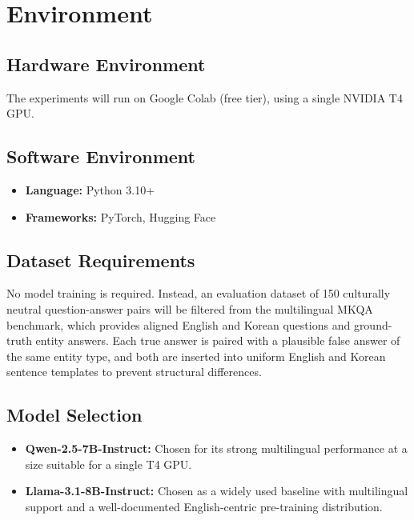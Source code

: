 \section{Environment}
\label{sec:environment}

\subsection{Hardware Environment}

The experiments will run on Google Colab (free tier), using a single NVIDIA T4 GPU.

\subsection{Software Environment}

\begin{itemize}
    \item \textbf{Language:} Python 3.10+
    \item \textbf{Frameworks:} PyTorch, Hugging Face
\end{itemize}

\subsection{Dataset Requirements}

No model training is required. Instead, an evaluation dataset of 150 culturally neutral question-answer pairs will be filtered from the multilingual MKQA benchmark, which provides aligned English and Korean questions and ground-truth entity answers. Each true answer is paired with a plausible false answer of the same entity type, and both are inserted into uniform English and Korean sentence templates to prevent structural differences.

\subsection{Model Selection}

\begin{itemize}
    \item \textbf{Qwen-2.5-7B-Instruct:} Chosen for its strong multilingual performance at a size suitable for a single T4 GPU.
    \item \textbf{Llama-3.1-8B-Instruct:} Chosen as a widely used baseline with multilingual support and a well-documented English-centric pre-training distribution.
\end{itemize}